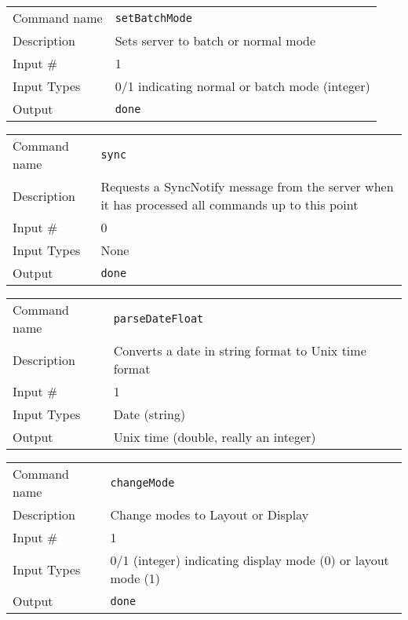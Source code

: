 \bigskip

\noindent
\begin{tabular}{l|p{5in}}
\hline
Command name & {\tt setBatchMode} \\
Description  & Sets server to batch or normal mode \\
Input \#     & 1 \\
Input Types  & 0/1 indicating normal or batch mode (integer) \\
Output       & {\tt done} \\
\hline
\end{tabular}

\bigskip

\noindent
\begin{tabular}{l|p{5in}}
\hline
Command name & {\tt sync} \\
Description  & Requests a SyncNotify message from the server when it has
               processed all commands up to this point \\
Input \#     & 0 \\
Input Types  & None \\
Output       & {\tt done} \\
\hline
\end{tabular}

\bigskip

\noindent
\begin{tabular}{l|p{5in}}
\hline
Command name & {\tt parseDateFloat} \\
Description  & Converts a date in string format to Unix time format \\
Input \#     & 1 \\
Input Types  & Date (string) \\
Output       & Unix time (double, really an integer) \\
\hline
\end{tabular}

\bigskip

\noindent
\begin{tabular}{l|p{5in}}
\hline
Command name & {\tt changeMode} \\
Description  & Change modes to Layout or Display \\
Input \#     & 1 \\
Input Types  & 0/1 (integer) indicating display mode (0) or layout mode (1) \\
Output       & {\tt done} \\
\hline
\end{tabular}

